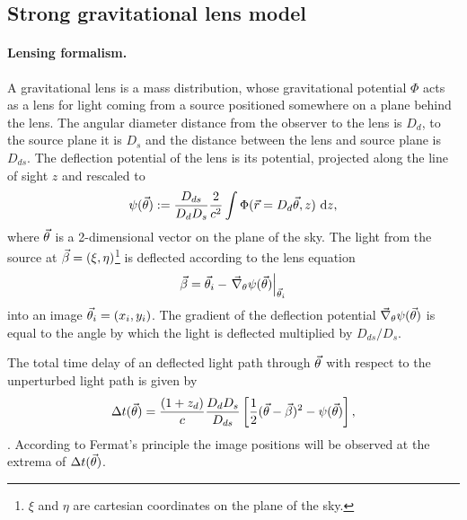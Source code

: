 \subsection{Strong gravitational lens model} \label{sec:lensing_theo}

\paragraph{Lensing formalism.} A gravitational lens is a mass distribution, whose gravitational potential $\Phi$ acts as a lens for light coming from a source positioned somewhere on a plane behind the lens. The angular diameter distance from the observer to the lens is $D_d$, to the source plane it is $D_s$ and the distance between the lens and source plane is $D_{ds}$. The deflection potential of the lens is its potential, projected along the line of sight $z$ and rescaled to
\begin{equation}
\psi(\vec{\theta}) := \frac{D_{ds}}{D_d D_s} \frac{2}{c^2} \int \Phi(\vec{r}=D_d \vec{\theta},z) {\ \mathrm d} z, \label{eq:psidef}
\end{equation}
where $\vec{\theta}$ is a 2-dimensional vector on the plane of the sky. The light from the source at $\vec{\beta} = (\xi,\eta)$\footnote{$\xi$ and $\eta$ are cartesian coordinates on the plane of the sky.} is deflected according to the lens equation
\begin{equation}
\vec{\beta} = \vec{\theta}_i - \left.\vec{\nabla}_\theta \psi(\vec{\theta})\right|_{\vec{\theta}_i} \label{eq:lenseqpot}
\end{equation}
into an image $\vec{\theta}_i = (x_i,y_i)$. The gradient of the deflection potential $\vec{\nabla}_\theta \psi(\vec{\theta})$ is equal to the angle by which the light is deflected multiplied by $D_{ds}/D_{s}$.

The total time delay of an deflected light path through $\vec{\theta}$ with respect to the unperturbed light path is given by 
\begin{equation}
\Delta t(\vec{\theta}) = \frac{(1+z_d)}{c} \frac{D_d D_s}{D_{ds}} \left[ \frac 12 (\vec{\theta} - \vec{\beta})^2 - \psi(\vec{\theta})\right], \label{eq:timedelay}
\end{equation}
\citep{BartGravLens}. According to Fermat's principle the image positions will be observed at the extrema of $\Delta t(\vec{\theta})$.

